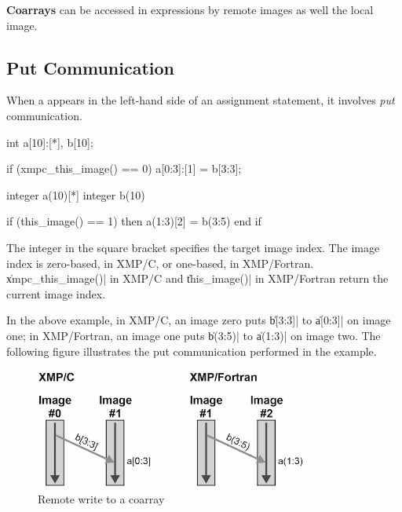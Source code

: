 {\bf Coarrays} can be accessed in expressions by remote images as well the
local image.


\subsection{Put Communication}

When a {\coarray} appears in the left-hand side of an
assignment statement, it involves {\it put} communication.

\begin{XCexample}
int a[10]:[*], b[10];

if (xmpc_this_image() == 0)
  a[0:3]:[1] = b[3:3];
\end{XCexample}

\begin{XFexample}
integer a(10)[*]
integer b(10)

if (this_image() == 1) then
  a(1:3)[2] = b(3:5)
end if
\end{XFexample}

The integer in the square bracket specifies the target image index. The
image index is zero-based, in XMP/C, or one-based, in
XMP/Fortran. \|xmpc_this_image()| in XMP/C and \|this_image()| in
XMP/Fortran return the current image index.



In the above example, in XMP/C, an image zero puts \|b[3:3]| to
\|a[0:3]| on image one; in XMP/Fortran, an image one puts \|b(3:5)| to
\|a(1:3)| on image two. The following figure illustrates the put
communication performed in the example.

\begin{figure}
  \centering
  \includegraphics[width=0.8\textwidth]{figs/put.png}
  \caption{Remote write to a coarray}
\end{figure}

